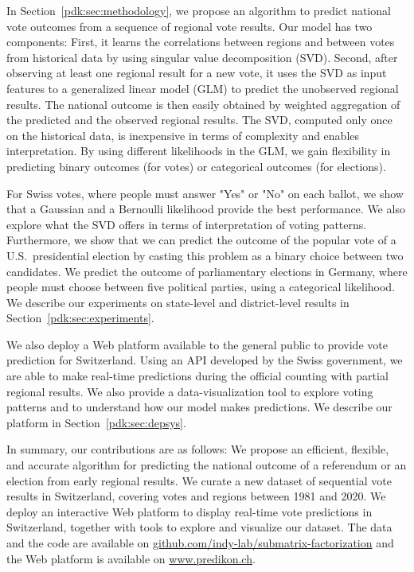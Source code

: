 In Section~\ref{pdk:sec:methodology}, we propose an algorithm to predict national vote outcomes from a sequence of regional vote results.
Our model has two components:
First, it learns the correlations between regions and between votes from historical data by using singular value decomposition (SVD).
Second, after observing at least one regional result for a new vote, it uses the SVD as input features to a generalized linear model (GLM) to predict the unobserved regional results.
The national outcome is then easily obtained by weighted aggregation of the predicted and the observed regional results.
The SVD, computed only once on the historical data, is inexpensive in terms of complexity and enables interpretation.
By using different likelihoods in the GLM, we gain flexibility in predicting binary outcomes (for votes) or categorical outcomes (for elections).

For Swiss votes, where people must answer "Yes" or "No" on each ballot, we show that a Gaussian and a Bernoulli likelihood provide the best performance.
We also explore what the SVD offers in terms of interpretation of voting patterns.
Furthermore, we show that we can predict the outcome of the popular vote of a U.S.\ presidential election by casting this problem as a binary choice between two candidates.
We predict the outcome of parliamentary elections in Germany, where people must choose between five political parties, using a categorical likelihood.
We describe our experiments on state-level and district-level results in Section~\ref{pdk:sec:experiments}.

We also deploy a Web platform available to the general public to provide vote prediction for Switzerland.
Using an API developed by the Swiss government, we are able to make real-time predictions during the official counting with partial regional results.
We also provide a data-visualization tool to explore voting patterns and to understand how our model makes predictions.
We describe our platform in Section~\ref{pdk:sec:depsys}.

In summary, our contributions are as follows:
We propose an efficient, flexible, and accurate algorithm for predicting the national outcome of a referendum or an election from early regional results.
We curate a new dataset of sequential vote results in Switzerland, covering  votes and  regions between 1981 and 2020.
We deploy an interactive Web platform to display real-time vote predictions in Switzerland, together with tools to explore and visualize our dataset.
The data and the code are available on \href{https://www.github.com/indy-lab/submatrix-factorization}{github.com/indy-lab/submatrix-factorization} and the Web platform is available on \href{http://www.predikon.ch}{www.predikon.ch}.
